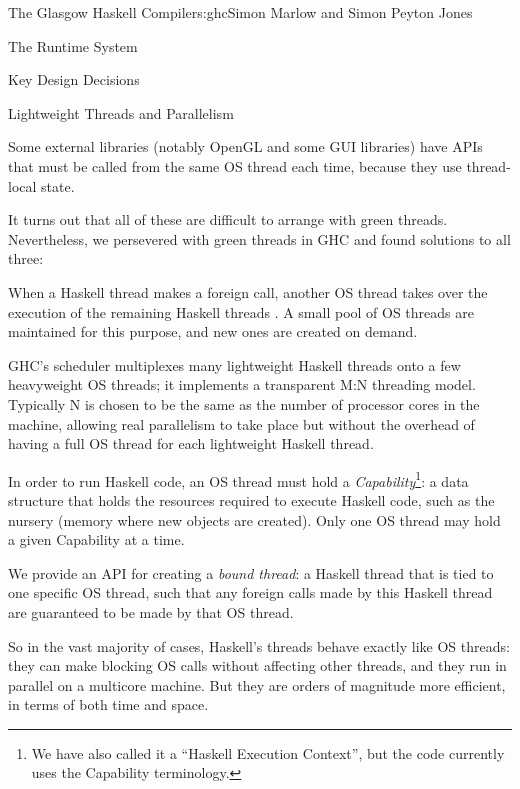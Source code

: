 \begin{aosachapter}{The Glasgow Haskell Compiler}{s:ghc}{Simon Marlow and Simon Peyton Jones}
\begin{aosasect1}{The Runtime System}
\begin{aosasect2}{Key Design Decisions}
\begin{aosasect3}{Lightweight Threads and Parallelism}
\begin{aosaitemize}
\item Some external libraries (notably OpenGL and some GUI libraries)
  have APIs that must be called from the same OS thread each time,
  because they use thread-local state.

\end{aosaitemize}

It turns out that all of these are difficult to arrange with green
threads.  Nevertheless, we persevered with green threads in GHC and
found solutions to all three:

\begin{aosaitemize}

\item When a Haskell thread makes a foreign call, another OS thread
  takes over the execution of the remaining Haskell threads
  \cite{bib:concffi04}.  A small pool of OS threads are maintained for
  this purpose, and new ones are created on demand.

\item GHC's scheduler multiplexes many lightweight Haskell threads
  onto a few heavyweight OS threads; it implements a transparent M:N
  threading model.  Typically N is chosen to be the same as the number
  of processor cores in the machine, allowing real parallelism to take
  place but without the overhead of having a full OS thread for each
  lightweight Haskell thread.

  In order to run Haskell code, an OS thread must hold a
  \emph{Capability}\footnote{We have also called it a ``Haskell
    Execution Context'', but the code currently uses the Capability
    terminology.}: a data structure that holds the resources required
  to execute Haskell code, such as the nursery (memory where new
  objects are created).  Only one OS thread may hold a given
  Capability at a time.

\item We provide an API for creating a \emph{bound thread}: a Haskell
  thread that is tied to one specific OS thread, such that any foreign
  calls made by this Haskell thread are guaranteed to be made by that
  OS thread.

\end{aosaitemize}

So in the vast majority of cases, Haskell's threads behave exactly
like OS threads: they can make blocking OS calls without affecting
other threads, and they run in parallel on a multicore machine.  But
they are orders of magnitude more efficient, in terms of both time and
space.


\end{aosasect3}
\end{aosasect2}
\end{aosasect1}
\end{aosachapter}
